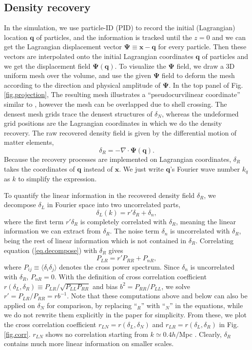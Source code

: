 \documentclass[aps,prd,twocolumn,superscriptaddress,amsfont,amssymb,amsmath,nofootinbib,showpacs,balancelastpage]{revtex4-1}
\newcommand{\bs}{\boldsymbol}
\begin{document}
\subsection{Density recovery}\label{ss.reco}
In the simulation, we use particle-ID (PID) to record the initial (Lagrangian) location ${\bs
q}$ of particles, and the information is tracked until the $z=0$ and we can get the
Lagrangian displacement vector ${\bs \Psi}\equiv{\bs x}-{\bs q}$ for every
particle. Then these vectors are interpolated onto the initial Lagrangian
coordinates ${\bs q}$ of particles and we get the displacement field ${\bs \Psi}
({\bs q})$.
To visualize the $\bs\Psi$ field, we draw a 3D uniform mesh over the volume,
and use the given $\bs\Psi$ field to deform the mesh according to the direction
and physical amplitude of $\bs\Psi$. In the top panel of Fig.\ref{fig.projection},
The resulting mesh illustrates a ``pseudocurvilinear coordinate'' similar to \cite{1995ApJS..100..269P},
however the mesh can be overlapped due to shell crossing. The densest mesh grids
trace the densest structures of $\delta_N$, whereas the undeformed grid positions
are the Lagrangian coordinates in which we do the density recovery.
The raw recovered density field is given by the differential motion of matter
elements,
\begin{equation}
    \delta_R=-\nabla\cdot{\bs \Psi}({\bs q}).
\end{equation}
Because the recovery processes are implemented on Lagrangian coordinates,
$\delta_R$ takes the coordinates of $\bs q$ instead of $\bs x$.
We just write $\bs q$'s Fourier wave number
$k_q$ as $k$ to simplify the expression.

To quantify the linear information in the recovered density field $\delta_R$,
we decompose $\delta_L$ in Fourier space into two uncorrelated parts,
\begin{equation}\label{eq.decompose}
    \delta_L(k)=r'\delta_R+\delta_n,
\end{equation}
where the first term $r'\delta_R$ is completely correlated with $\delta_R$,
meaning the linear information we can extract from $\delta_R$.
The noise term $\delta_n$ is uncorrelated with $\delta_R$, being
the rest of linear information which is not contained in $\delta_R$.
Correlating equation (\ref{eq.decompose}) with $\delta_R$ gives
\begin{equation}
    P_{LR}=r'P_{RR}+P_{nR},
\end{equation}
where $P_{ij}\equiv\langle\delta_i\delta_j\rangle$ denotes the cross power
spectrum. Since $\delta_n$ is uncorrelated with $\delta_R$, $P_{nR}=0$. With the
definition of cross correlation coefficient $r(\delta_L,\delta_R)\equiv P_{LR}/\sqrt{P_{LL}P_{RR}}$
and bias $b^2=P_{RR}/P_{LL}$, we solve $r'=P_{LR}/P_{RR}=rb^{-1}$.
Note that these computations above and below can also be applied on $\delta_N$ for
comparison, by replacing ``$_R$'' with ``$_N$'' in the equations,
while we do not rewrite them explicitly
in the paper for simplicity. From these, we plot the cross
correlation coefficient $r_{LN}=r(\delta_L,\delta_N)$ and
$r_{LR}=r(\delta_L,\delta_R)$ in Fig.\ref{fig.corr}.
$r_{LN}$ shows no correlation starting from $k\simeq 0.4 h/$Mpc \citep{2004MNRAS.355..129S}.
Clearly, $
\delta_R$ contains much more linear information on smaller scales.
\end{document}
